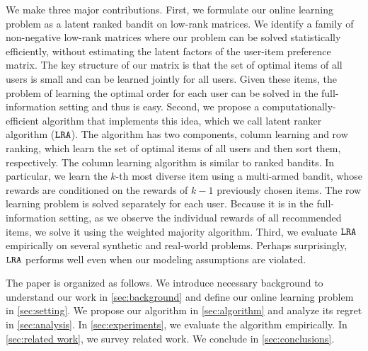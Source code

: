 We make three major contributions. First, we formulate our online learning problem as a latent ranked bandit on low-rank matrices. We identify a family of non-negative low-rank matrices where our problem can be solved statistically efficiently, without estimating the latent factors of the user-item preference matrix. The key structure of our matrix is that the set of optimal items of all users is small and can be learned jointly for all users. Given these items, the problem of learning the optimal order for each user can be solved in the full-information setting and thus is easy. Second, we propose a computationally-efficient algorithm that implements this idea, which we call latent ranker algorithm (${\tt LRA}$). The algorithm has two components, column learning and row ranking, which learn the set of optimal items of all users and then sort them, respectively. The column learning algorithm is similar to ranked bandits. In particular, we learn the $k$-th most diverse item using a multi-armed bandit, whose rewards are conditioned on the rewards of $k - 1$ previously chosen items. The row learning problem is solved separately for each user. Because it is in the full-information setting, as we observe the individual rewards of all recommended items,  we solve it using the weighted majority algorithm. Third, we evaluate ${\tt LRA}$ empirically on several synthetic and real-world problems. Perhaps surprisingly, ${\tt LRA}$ performs well even when our modeling assumptions are violated.

The paper is organized as follows. We introduce necessary background to understand our work in \cref{sec:background} and define our online learning problem in \cref{sec:setting}. We propose our algorithm in \cref{sec:algorithm} and analyze its regret in \cref{sec:analysis}. In \cref{sec:experiments}, we evaluate the algorithm empirically. In \cref{sec:related work}, we survey related work. We conclude in \cref{sec:conclusions}. 

